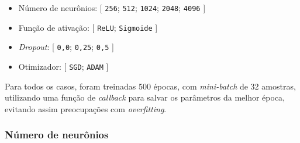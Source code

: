 \begin{itemize}
	\item Número de neurônios: [ \texttt{256}; \texttt{512}; \texttt{1024}; \texttt{2048}; \texttt{4096} ]
	\item Função de ativação: [ \texttt{ReLU}; \texttt{Sigmoide} ]
	\item \textit{Dropout}: [ \texttt{0,0}; \texttt{0,25}; \texttt{0,5} ]
	\item Otimizador: [ \texttt{SGD}; \texttt{ADAM} ]
\end{itemize} 

Para todos os casos, foram treinadas 500 épocas, com \textit{mini-batch} de 32 amostras, utilizando uma função de \textit{callback} para salvar os parâmetros da melhor época, evitando assim preocupações com \textit{overfitting}.

\subsubsection{Número de neurônios}



